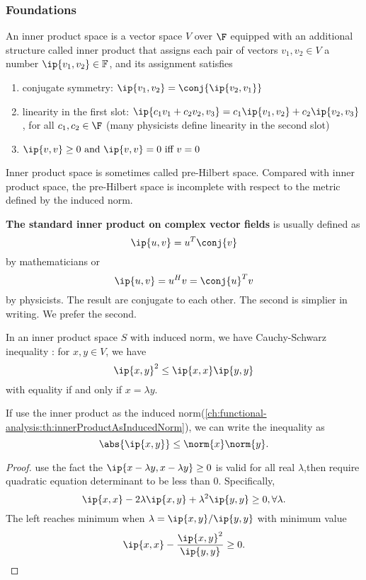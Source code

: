 \begin{refsection}
\subsubsection{Foundations}
\begin{definition}
	An inner product space is a vector space $V$ over $\F$ equipped with an additional structure called inner product that assigns each pair of vectors $v_1,v_2 \in V$ a number $\ip{v_1,v_2} \in \mathbb{F}$, and its assignment satisfies
	\begin{enumerate}
		\item conjugate symmetry: $\ip{v_1,v_2} = \conj{\ip{v_2,v_1}}$
		\item linearity in the first slot: $\ip{c_1v_1 + c_2v_2,v_3}=c_1\ip{v_1,v_2}+c_2 \ip{v_2,v_3}$, for all $c_1,c_2 \in \F$ (many physicists define linearity in the second slot)
		\item $\ip{v,v} \geq 0 ~\text{and} ~ \ip{v,v} = 0 ~\text{iff} ~ v=0$
	\end{enumerate}
\end{definition}


\begin{remark}
	Inner product space is sometimes called pre-Hilbert space. Compared with inner product space, the pre-Hilbert space is incomplete with respect to the metric defined by the induced norm. 
\end{remark}

\begin{remark}\textbf{The standard inner product on complex vector fields} is usually defined as $$\ip{u,v}=u^T\conj{v} $$ by mathematicians
	or
	$$\ip{u,v}=u^Hv = \conj{u}^T v$$
	by physicists. The result are conjugate to each other. The second is simplier in writing. We prefer the second. 
\end{remark}





\begin{theorem}\label{ch:functional-analysis:th:Cauchy-SchwarzInequalityInnerProductSpace}
	\cite{johnsonbaugh2010foundations}\cite[100]{moon2000mathematical}In an inner product space $S$ with induced norm, we have
	Cauchy-Schwarz inequality : for $x,y \in V$, we have
	$$\ip{x,y}^2 \leq \ip{x,x}\ip{y,y}$$
	with equality if and only if $x=\lambda y$. 
	
	If use the inner product as the induced norm(\autoref{ch:functional-analysis:th:innerProductAsInducedNorm}), we can write the inequality as
	$$\abs{\ip{x,y}} \leq \norm{x}\norm{y}.$$
\end{theorem}
\begin{proof}
	use the fact the $\ip{x-\lambda y,x-\lambda y} \geq 0$ is valid for all real $\lambda$,then require quadratic equation determinant to be less than 0.	Specifically, 
	$$\ip{x,x} - 2\lambda \ip{x,y} + \lambda^2 \ip{y,y} \geq 0, \forall \lambda.$$
	The left reaches minimum when $\lambda = \ip{x,y}/\ip{y,y}$ with minimum value
	$$\ip{x,x} - \frac{\ip{x,y}^2}{\ip{y,y}} \geq 0.$$
\end{proof}




\end{refsection}
